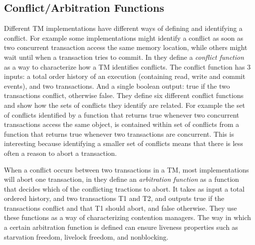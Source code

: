 \subsection{Conflict/Arbitration Functions}
Different TM implementations have different ways of defining and identifying a conflict.
For example some implementations might identify a conflict as soon as two concurrent transaction access the same memory location, while others might wait until when a transaction tries to commit.
In \cite{scott:semantics:transact:2006} they define a \emph{conflict function} as a way to characterize how a TM identifies conflicts.
The conflict function has 3 inputs: a total order history of an execution (containing read, write and commit events), and two transactions.  And a single boolean output: true if the two transactions conflict, otherwise false.
They define six different conflict functions and show how the sets of conflicts they identify are related.
For example the set of conflicts identified by a function that returns true whenever two concurrent transactions access the same object, is contained within set of conflicts from a function that returns true whenever two transactions are concurrent.
This is interesting because identifying a smaller set of conflicts means that there is less often a reason to abort a transaction.

When a conflict occurs between two transactions in a TM, most implementations will abort one transaction, in \cite{scott:semantics:transact:2006} they define an \emph{arbitration function} as a function that decides which of the conflicting tractions to abort.
It takes as input a total ordered history, and two transactions T1 and T2, and outputs true if the transactions conflict and that T1 should abort, and false otherwise.
They use these functions as a way of characterizing contention managers.
The way in which a certain arbitration function is defined can ensure liveness properties such as starvation freedom, livelock freedom, and nonblocking.


